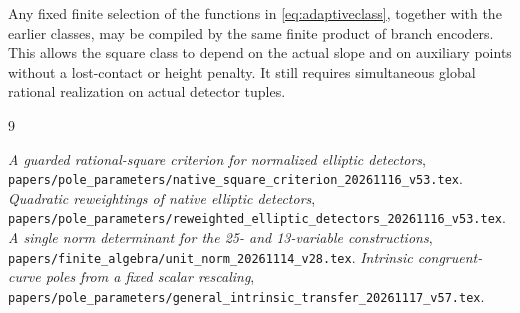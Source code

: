 \documentclass[11pt,a4paper]{article}
\begin{document}
Any fixed finite selection of the functions in
\eqref{eq:adaptiveclass}, together with the earlier classes, may be
compiled by the same finite product of branch encoders. This allows
the square class to depend on the actual slope and on auxiliary
points without a lost-contact or height penalty. It still requires
simultaneous global rational realization on actual detector tuples.

\begin{thebibliography}{9}\raggedright
{}\emph{A guarded rational-square criterion for normalized
elliptic detectors},
\nolinkurl{papers/pole_parameters/native_square_criterion_20261116_v53.tex}.
\emph{Quadratic reweightings of native elliptic
detectors},
\nolinkurl{papers/pole_parameters/reweighted_elliptic_detectors_20261116_v53.tex}.
\emph{A single norm determinant for the 25- and 13-variable
constructions},
\nolinkurl{papers/finite_algebra/unit_norm_20261114_v28.tex}.
\emph{Intrinsic congruent-curve poles from a fixed scalar
rescaling},
\nolinkurl{papers/pole_parameters/general_intrinsic_transfer_20261117_v57.tex}.
\end{thebibliography}
\end{document}
